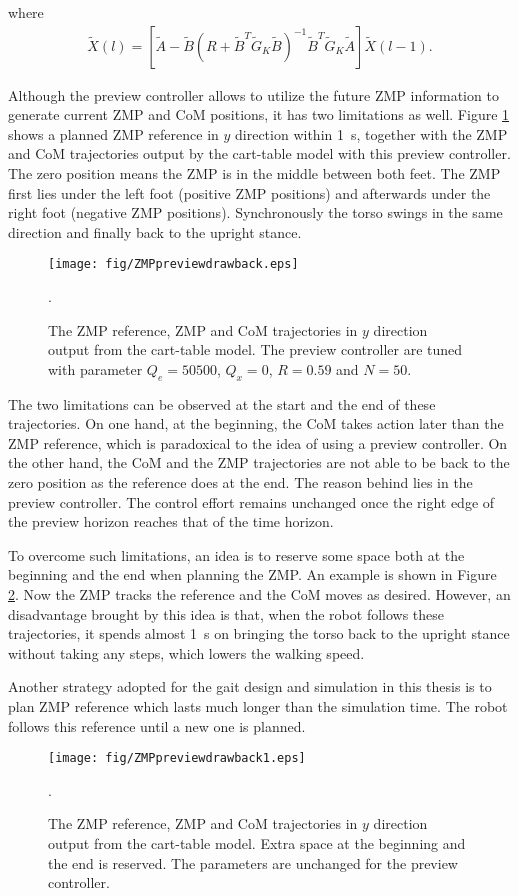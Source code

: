 where 
\begin{align*}
\tilde{X}(l)=\left[\tilde{A}-\tilde{B}\left(R+\tilde{B}^T\tilde{G}_K\tilde{B}\right)^{-1}\tilde{B}^T\tilde{G}_K\tilde{A}\right]\tilde{X}(l-1).
\end{align*}


Although the preview controller allows to utilize the future ZMP information to generate current ZMP and CoM positions, it has two limitations as well. Figure {\ref{zmppreviewdrawback}} shows a planned ZMP reference in $ y $ direction within \SI{1}{\second}, together with the ZMP and CoM trajectories output by the cart-table model with this preview controller. The zero position means the ZMP is in the middle between both feet. The ZMP first lies under the left foot (positive ZMP positions) and afterwards under the right foot (negative ZMP positions). Synchronously the torso swings in the same direction and finally back to the upright stance.
\begin{figure}[H]
	\centering
	\texttt{[image: fig/ZMPpreviewdrawback.eps]}
	\caption[Limitations of the preview controller]{The ZMP reference, ZMP and CoM trajectories in $ y $  direction output from the cart-table model. The preview controller are tuned with parameter $ Q_e = 50500$, $ Q_x =0$, $ R=0.59 $ and $ N=50 $.}.
	\label{zmppreviewdrawback}
\end{figure}

The two limitations can be observed at the start and the end of these trajectories. On one hand, at the beginning, the CoM takes action later than the ZMP reference, which is paradoxical to the idea of using a preview controller. On the other hand, the CoM and the ZMP trajectories are not able to be back to the zero position as the reference does at the end. The reason behind lies in the preview controller. The control effort remains unchanged once the right edge of the preview horizon reaches that of the time horizon. 

To overcome such limitations, an idea is to reserve some space both at the beginning and the end when planning the ZMP. An example is shown in Figure {\ref{zmppreviewspace}}. Now the ZMP tracks the reference and the CoM moves as desired. However, an disadvantage brought by this idea is that, when the robot follows these trajectories, it spends almost \SI{1}{\second} on bringing the torso back to the upright stance without taking any steps, which lowers the walking speed.

Another strategy adopted for the gait design and simulation in this thesis is to plan ZMP reference which lasts much longer than the simulation time. The robot follows this reference until a new one is planned. 
\begin{figure}[H]
	\centering
	\texttt{[image: fig/ZMPpreviewdrawback1.eps]}
	\caption[Space is reserved to overcome the limitations of the preview controller]{The ZMP reference, ZMP and CoM trajectories in $ y $  direction output from the cart-table model. Extra space at the beginning and the end is reserved. The parameters are unchanged for the preview controller.}.
	\label{zmppreviewspace}
\end{figure}

